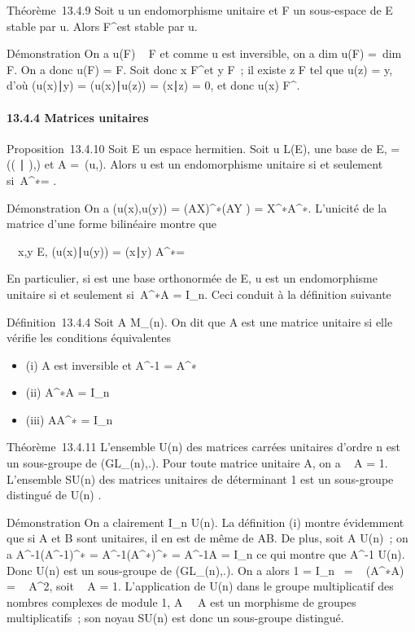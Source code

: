 \documentclass[]{article}
\begin{document}
Théorème~13.4.9 Soit u un endomorphisme unitaire et F un sous-espace de
E stable par u. Alors F^\bot est stable par u.

Démonstration On a u(F) \subset~ F et comme u est inversible, on a
dim u(F) =\ dim~ F. On
a donc u(F) = F. Soit donc x \in F^\bot et y \in F~; il existe z \in F
tel que u(z) = y, d'où (u(x)∣y) =
(u(x)∣u(z)) =
(x∣z) = 0, et donc u(x) \in F^\bot.

\paragraph{13.4.4 Matrices unitaires}

Proposition~13.4.10 Soit E un espace hermitien. Soit u \in L(E),  une
base de E, \Omega = \mathrmMat~
(( ∣ ),) et A =\
\mathrmMat (u,). Alors u est un endomorphisme
unitaire si et seulement si~A^∗\OmegaA = \Omega.

Démonstration On a \phi(u(x),u(y)) = (AX)^∗\Omega(AY ) =
X^∗A^∗\OmegaAY . L'unicité de la matrice d'une forme
bilinéaire montre que

\forall~~x,y \in E,
(u(x)∣u(y)) =
(x∣y) \mathrel\Leftrightarrow
A^∗\OmegaA = \Omega

En particulier, si  est une base orthonormée de E, u est un
endomorphisme unitaire si et seulement si~A^∗A =
I_n. Ceci conduit à la définition suivante

Définition~13.4.4 Soit A \in M_(n). On dit que A est une matrice
unitaire si elle vérifie les conditions équivalentes

\begin{itemize}
\itemsep1pt\parskip0pt
\item
  (i) A est inversible et A^-1 = A^∗
\item
  (ii) A^∗A = I_n
\item
  (iii) AA^∗ = I_n
\end{itemize}

Théorème~13.4.11 L'ensemble U(n) des matrices carrées unitaires d'ordre
n est un sous-groupe de (GL_\mathbb{C}(n),.). Pour toute matrice
unitaire A, on a
~
A = 1. L'ensemble SU(n) des matrices unitaires de déterminant
1 est un sous-groupe distingué de U(n) .

Démonstration On a clairement I_n \in U(n). La définition (i)
montre évidemment que si A et B sont unitaires, il en est de même de AB.
De plus, soit A \in U(n)~; on a
A^-1(A^-1)^∗ =
A^-1(A^∗)^∗ = A^-1A =
I_n ce qui montre que A^-1 \in U(n). Donc U(n) est un
sous-groupe de (GL_(n),.). On a alors 1
=  I_n~
= ~
(A^∗A) =
~
A^2, soit
\mathrm{det}~
A = 1. L'application de U(n) dans le groupe multiplicatif des
nombres complexes de module 1,
A\mapsto~~
A est un morphisme de groupes multiplicatifs~; son noyau SU(n) est donc
un sous-groupe distingué.
\end{document}
